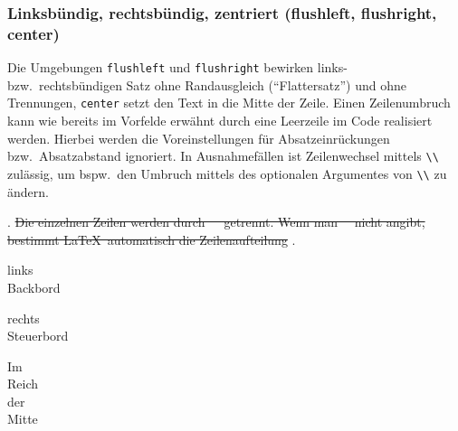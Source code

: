  
{\hfuzz=2pt\relax %
\subsubsection
          [Flattersatz (flush\-left, flush\-right, center)]
          {Linksbündig, rechtsbündig, zentriert
                       (flush\-left, flush\-right, center)}
}

Die Umgebungen \texttt{flushleft} und \texttt{flushright}
bewirken links- bzw.\ rechtsbündigen Satz ohne Randausgleich 
("`Flattersatz"') und ohne Trennungen, 
\texttt{center} setzt den Text in
die Mitte der Zeile. Einen Zeilenumbruch kann wie bereits im Vorfelde 
erwähnt durch eine Leerzeile im Code realisiert werden. Hierbei
werden die Voreinstellungen für Absatzeinrückungen bzw.\ Absatzabstand
ignoriert. In Ausnahmefällen ist Zeilenwechsel mittels \lstinline+\\+ zulässig,
um bspw.\ den Umbruch mittels des optionalen Argumentes von \lstinline+\\+
zu ändern.

.
\sout{Die einzelnen Zeilen werden durch~\string\ \string\ getrennt.
Wenn man \string\ \string\ nicht angibt, bestimmt \LaTeX\ automatisch die
Zeilenaufteilung%
}
.
\begin{LTXexample}
\begin{flushleft}
links \\[.5cm]
Backbord
\end{flushleft}
\end{LTXexample}

\begin{LTXexample}
\begin{flushright}
rechts  \\[-0.2cm]
Steuerbord
\end{flushright}
\end{LTXexample}

\begin{LTXexample}
\begin{center}
Im \\ Reich \\ der \\ Mitte
\end{center}
\end{LTXexample}

